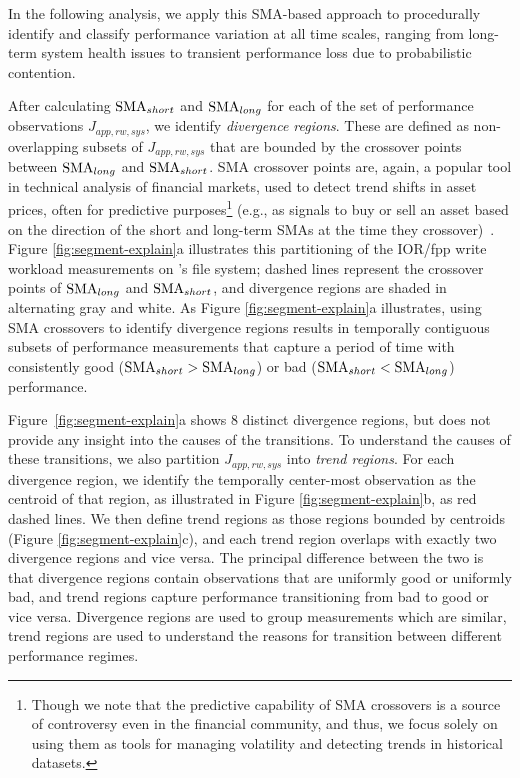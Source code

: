 In the following analysis, we apply this SMA-based approach to procedurally identify and classify performance variation at all time scales, ranging from long-term system health issues to transient performance loss due to probabilistic contention.



After calculating $\textup{SMA}_{short}$ and $\textup{SMA}_{long}$ for each of the set of performance observations $J_{app, rw, sys}$, we identify \emph{divergence regions}. These are defined as non-overlapping subsets of $J_{app, rw, sys}$ that are bounded by the crossover points between $\textup{SMA}_{long}$ and $\textup{SMA}_{short}$.
SMA crossover points are, again, a popular tool in technical analysis of financial markets, used to detect trend shifts in asset prices, often for predictive purposes\footnote{Though we note that the predictive capability of SMA crossovers is a source of controversy even in the financial community, and thus, we focus solely on using them as tools for managing volatility and detecting trends in historical datasets.} (e.g., as signals to buy or sell an asset based on the direction of the short and long-term SMAs at the time they crossover)~\cite{brock1992simple}.
Figure \ref{fig:segment-explain}a illustrates this partitioning of the IOR/fpp write workload measurements on \edison's \scratchtwo file system;
dashed lines represent the crossover points of $\textup{SMA}_{long}$ and $\textup{SMA}_{short}$, and divergence regions are shaded in alternating gray and white.
As Figure \ref{fig:segment-explain}a illustrates, using SMA crossovers to identify divergence regions results in temporally contiguous subsets of performance measurements that capture a period of time with consistently good (${\textup{SMA}_{short} > \textup{SMA}_{long}}$) or bad (${\textup{SMA}_{short} < \textup{SMA}_{long}}$) performance.

Figure~\ref{fig:segment-explain}a shows 8 distinct divergence regions, but does not provide any insight into the causes of the transitions. To understand the causes of these transitions, we also partition $J_{app, rw, sys}$ into \emph{trend regions}.
For each divergence region, we identify the temporally center-most observation as the centroid of that region, as illustrated in Figure \ref{fig:segment-explain}b, as red dashed lines.
We then define trend regions as those regions bounded by centroids (Figure \ref{fig:segment-explain}c), and each trend region overlaps with exactly two divergence regions and vice versa.
The principal difference between the two is that divergence regions contain observations that are uniformly good or uniformly bad, and trend regions capture performance transitioning from bad to good or vice versa. Divergence regions are used to group measurements which are similar, trend regions are used to understand the reasons for transition between different performance regimes.



